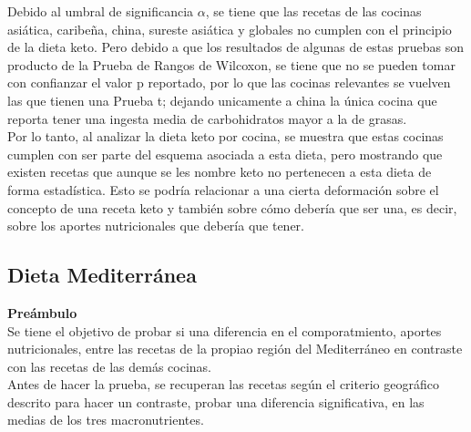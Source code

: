 \documentclass[12pt,a4paper]{article}
\begin{document}
{            Debido al umbral de significancia $\alpha$, se tiene que las recetas de las cocinas 
            asiática, caribeña, china, sureste asiática y globales no cumplen con el principio de la 
            dieta keto. Pero debido a que los resultados de algunas de estas pruebas son producto 
            de la  Prueba de Rangos de Wilcoxon, se tiene que no se pueden tomar con confianzar el 
            valor p reportado, por lo que las cocinas relevantes se vuelven las que tienen una Prueba 
            t; dejando unicamente a china la única cocina que reporta tener una ingesta media de carbohidratos 
            mayor a la de grasas.\\

            Por lo tanto, al analizar la dieta keto por cocina, se muestra que estas cocinas  
            cumplen con ser parte del esquema asociada a esta dieta, pero mostrando que existen recetas 
            que aunque se les nombre keto no pertenecen a esta dieta de forma estadística. Esto se podría 
            relacionar a una cierta deformación sobre el concepto de una receta keto y también sobre 
            cómo debería que ser una, es decir, sobre los aportes nutricionales que debería que tener.\\
        }
    
    \subsection{Dieta Mediterránea}
        \textbf{Preámbulo}\\
        {
            Se tiene el objetivo de probar si una diferencia en el comporatmiento, aportes 
            nutricionales, entre las recetas de la propiao región del Mediterráneo en contraste 
            con las recetas de las demás cocinas.\\

            Antes de hacer la prueba, se recuperan las recetas según el criterio geográfico 
            descrito para hacer un contraste, probar una diferencia significativa, en las medias 
            de los tres macronutrientes.\\
        }
\end{document}
